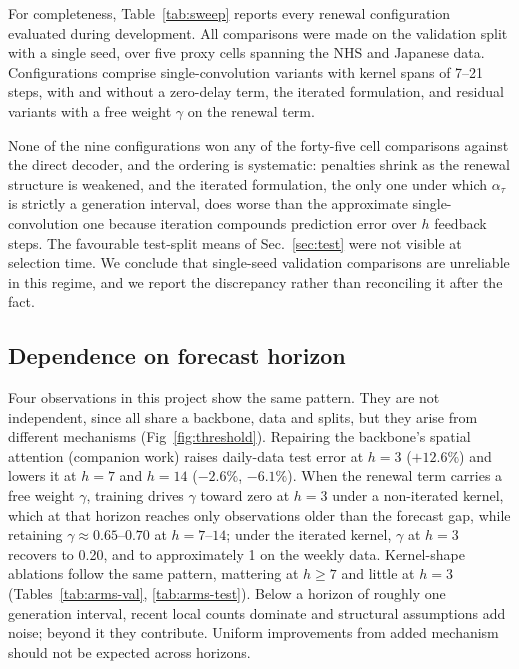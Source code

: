 \documentclass[10pt,letterpaper]{article}
\begin{document}
For completeness, Table~\ref{tab:sweep} reports every renewal configuration
evaluated during development. All comparisons were made on the validation
split with a single seed, over five proxy cells spanning the NHS and Japanese
data. Configurations comprise single-convolution variants with kernel spans
of 7--21 steps, with and without a zero-delay term, the iterated formulation,
and residual variants with a free weight $\gamma$ on the renewal term.

None of the nine configurations won any of the forty-five cell comparisons
against the direct decoder, and the ordering is systematic: penalties shrink
as the renewal structure is weakened, and the iterated formulation, the only
one under which $\alpha_\tau$ is strictly a generation interval, does worse
than the approximate single-convolution one because iteration compounds
prediction error over $h$ feedback steps. The favourable test-split means of
Sec.~\ref{sec:test} were not visible at selection time. We conclude that
single-seed validation comparisons are unreliable in this regime, and we
report the discrepancy rather than reconciling it after the fact.

\begin{table}[ht]
\centering
\caption{Development search record (validation split, seed 42, five proxy
cells, compared against the direct decoder). Nine configurations were
evaluated; two additional runs were invalidated by a harness fault and
repeated. The count is reported for multiple-comparison transparency.}

\label{tab:sweep}
\end{table}

\subsection{Dependence on forecast horizon}
\label{sec:threshold}

Four observations in this project show the same pattern. They are not
independent, since all share a backbone, data and splits, but they arise
from different mechanisms
(Fig~\ref{fig:threshold}). Repairing the backbone's spatial attention
(companion work) raises daily-data test error at $h=3$ ($+12.6\%$) and lowers
it at $h=7$ and $h=14$ ($-2.6\%$, $-6.1\%$). When the renewal term carries a
free weight $\gamma$, training drives $\gamma$ toward zero at $h=3$ under a
non-iterated kernel, which at that horizon reaches only observations older
than the forecast gap, while retaining $\gamma\approx0.65$--$0.70$ at
$h=7$--$14$; under the iterated kernel, $\gamma$ at $h=3$ recovers to 0.20,
and to approximately 1 on the weekly data. Kernel-shape ablations follow the
same pattern, mattering at $h\geq7$ and little at $h=3$
(Tables~\ref{tab:arms-val}, \ref{tab:arms-test}). Below a horizon of roughly
one generation interval, recent local counts dominate and structural
assumptions add noise; beyond it they contribute. Uniform improvements from
added mechanism should not be expected across horizons.
\end{document}
